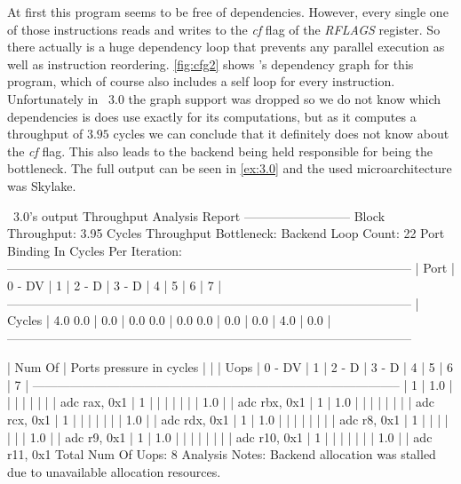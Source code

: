 \FloatBarrier

At first this program seems to be free of dependencies. However, every single one of those instructions reads and writes to the \emph{cf} flag of the \emph{RFLAGS} register. So there actually is a huge dependency loop that prevents any parallel execution as well as instruction reordering. \autoref{fig:cfg2} shows \suaca's dependency graph for this program, which of course also includes a self loop for every instruction.\\
Unfortunately in \iaca\ $3.0$ the graph support was dropped so we do not know which dependencies is does use exactly for its computations, but as it computes a throughput of $3.95$ cycles we can conclude that it definitely does not know about the \emph{cf} flag. This also leads to the backend being held responsible for being the bottleneck. The full output can be seen in \autoref{ex:3.0} and the used microarchitecture was Skylake. 

\begin{LabeledExample}{\iaca\ $3.0$'s output}{\label{ex:3.0}}
    Throughput Analysis Report
    --------------------------
    Block Throughput: 3.95 Cycles       Throughput Bottleneck: Backend
    Loop Count:  22
    Port Binding In Cycles Per Iteration:
    --------------------------------------------------------------------------------------------------
    |  Port  |   0   -  DV   |   1   |   2   -  D    |   3   -  D    |   4   |   5   |   6   |   7   |
    --------------------------------------------------------------------------------------------------
    | Cycles |  4.0     0.0  |  0.0  |  0.0     0.0  |  0.0     0.0  |  0.0  |  0.0  |  4.0  |  0.0  |
    --------------------------------------------------------------------------------------------------
    
    
    | Num Of   |                    Ports pressure in cycles                         |      |
    |  Uops    |  0  - DV    |  1   |  2  -  D    |  3  -  D    |  4   |  5   |  6   |  7   |
    -----------------------------------------------------------------------------------------
    |   1      | 1.0         |      |             |             |      |      |      |      | adc rax, 0x1
    |   1      |             |      |             |             |      |      | 1.0  |      | adc rbx, 0x1
    |   1      | 1.0         |      |             |             |      |      |      |      | adc rcx, 0x1
    |   1      |             |      |             |             |      |      | 1.0  |      | adc rdx, 0x1
    |   1      | 1.0         |      |             |             |      |      |      |      | adc r8, 0x1
    |   1      |             |      |             |             |      |      | 1.0  |      | adc r9, 0x1
    |   1      | 1.0         |      |             |             |      |      |      |      | adc r10, 0x1
    |   1      |             |      |             |             |      |      | 1.0  |      | adc r11, 0x1
    Total Num Of Uops: 8
    Analysis Notes:
    Backend allocation was stalled due to unavailable allocation resources.
\end{LabeledExample}

